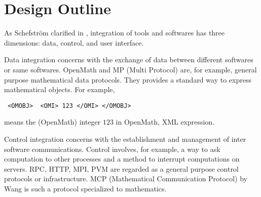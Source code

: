 
\section{Design Outline} 

As Schefstr\"om clarified in \cite{schefstrom},
integration of tools and softwares has three dimensions:
data, control, and user interface.

Data integration concerns with the exchange of data between different
softwares or same softwares.
OpenMath \cite{OpenMath} and MP (Multi Protocol) \cite{GKW} are,
for example, general purpose mathematical data protocols.
They provides a standard way to express mathematical objects.
For example,
\begin{verbatim}
 <OMOBJ>  <OMI> 123 </OMI> </OMOBJ>
\end{verbatim}
means the (OpenMath) integer $123$ in OpenMath, XML expression.

Control integration concerns with the establishment and management of
inter software communications.
Control involves, for example, a way to ask computation to other processes
and a method to interrupt computations on servers.
RPC, HTTP, MPI, PVM are regarded as a general purpose control protocols or
infrastructure.
MCP (Mathematical Communication Protocol)
by Wang \cite{iamc} is such a protocol specialized to mathematics.

